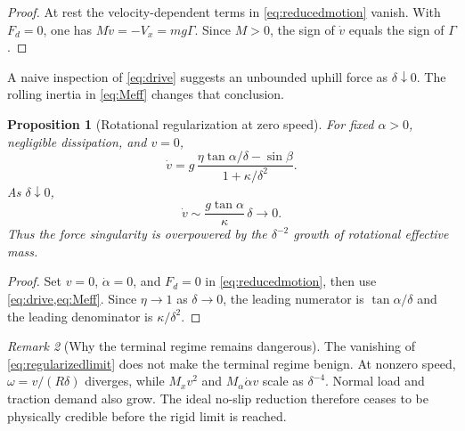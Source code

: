 \documentclass[11pt]{article}
\numberwithin{equation}{section}
\newtheorem{proposition}{Proposition}[section]
\theoremstyle{definition}
\theoremstyle{remark}
\newtheorem{remark}[proposition]{Remark}
\begin{document}
\begin{proof}
At rest the velocity-dependent terms in \cref{eq:reducedmotion} vanish.  With $F_d=0$, one has $M\dot v=-V_x=mg\Gamma$.  Since $M>0$, the sign of $\dot v$ equals the sign of $\Gamma$.
\end{proof}

A naive inspection of \cref{eq:drive} suggests an unbounded uphill force as $\delta\downarrow0$.  The rolling inertia in \cref{eq:Meff} changes that conclusion.

\begin{proposition}[Rotational regularization at zero speed]
\label{prop:regularization}
For fixed $\alpha>0$, negligible dissipation, and $v=0$,
\begin{equation}
  \dot v
  =g\,
  \frac{\eta\tan\alpha/\delta-\sin\beta}
       {1+\kappa/\delta^2}.
  \label{eq:restacceleration}
\end{equation}
As $\delta\downarrow0$,
\begin{equation}
  \dot v\sim\frac{g\tan\alpha}{\kappa}\,\delta
  \longrightarrow0.
  \label{eq:regularizedlimit}
\end{equation}
Thus the force singularity is overpowered by the $\delta^{-2}$ growth of rotational effective mass.
\end{proposition}

\begin{proof}
Set $v=0$, $\dot\alpha=0$, and $F_d=0$ in \cref{eq:reducedmotion}, then use \cref{eq:drive,eq:Meff}.  Since $\eta\to1$ as $\delta\to0$, the leading numerator is $\tan\alpha/\delta$ and the leading denominator is $\kappa/\delta^2$.
\end{proof}

\begin{remark}[Why the terminal regime remains dangerous]
The vanishing of \cref{eq:regularizedlimit} does not make the terminal regime benign.  At nonzero speed,
$\omega=v/(R\delta)$ diverges, while $M_xv^2$ and $M_\alpha\dot\alpha v$ scale as $\delta^{-4}$.  Normal load and traction demand also grow.  The ideal no-slip reduction therefore ceases to be physically credible before the rigid limit is reached.
\end{remark}
\end{document}
